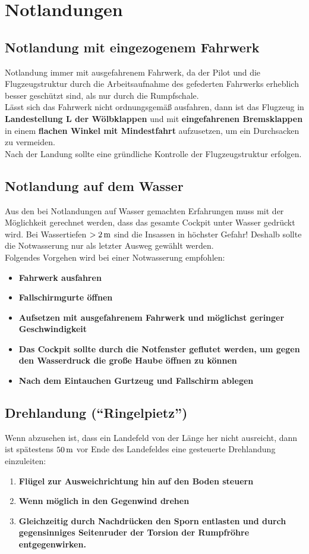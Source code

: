 \section{Notlandungen}
\subsection{Notlandung mit eingezogenem Fahrwerk}
Notlandung immer mit ausgefahrenem Fahrwerk, da der Pilot und die Flugzeugstruktur durch die Arbeitsaufnahme des gefederten Fahrwerks erheblich besser geschützt sind, als nur durch die Rumpfschale.\\
\newline
Lässt sich das Fahrwerk nicht ordnungsgemäß ausfahren, dann ist das Flugzeug in \textbf{Landestellung L der Wölbklappen} und mit \textbf{eingefahrenen Bremsklappen} in einem \textbf{flachen Winkel mit Mindestfahrt} aufzusetzen, um ein Durchsacken zu vermeiden.\\
Nach der Landung sollte eine gründliche Kontrolle der Flugzeugstruktur erfolgen.

\subsection{Notlandung auf dem Wasser}
Aus den bei Notlandungen auf Wasser gemachten Erfahrungen muss mit der Möglichkeit gerechnet werden, dass das gesamte Cockpit unter Wasser gedrückt wird. Bei Wassertiefen $>\unit[2]{m}$ sind die Insassen in höchster Gefahr! Deshalb sollte die Notwasserung nur als letzter Ausweg gewählt werden.\\
\newline
Folgendes Vorgehen wird bei einer Notwasserung empfohlen:
\begin{itemize}
\item \textbf{Fahrwerk ausfahren}
\item \textbf{Fallschirmgurte öffnen}
\item \textbf{Aufsetzen mit ausgefahrenem Fahrwerk und möglichst geringer Geschwindigkeit}
\item \textbf{Das Cockpit sollte durch die Notfenster geflutet werden, um gegen den Wasserdruck die große Haube öffnen zu können}
\item \textbf{Nach dem Eintauchen Gurtzeug und Fallschirm ablegen}
\end{itemize}

\subsection{Drehlandung ("`Ringelpietz"')}
Wenn abzusehen ist, dass ein Landefeld von der Länge her nicht ausreicht, dann ist spätestens $\unit[50]{m}$ vor Ende des Landefeldes eine gesteuerte Drehlandung einzuleiten:
\begin{enumerate}
\item \textbf{Flügel zur Ausweichrichtung hin auf den Boden steuern}
\item \textbf{Wenn möglich in den Gegenwind drehen}
\item \textbf{Gleichzeitig durch Nachdrücken den Sporn entlasten und durch gegensinniges Seitenruder der Torsion der Rumpfröhre entgegenwirken.}
\end{enumerate}


